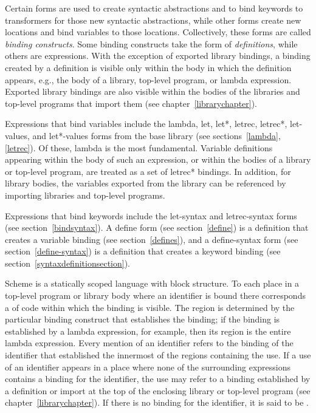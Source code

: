Certain forms are used to create syntactic abstractions
and to bind keywords to transformers for those new syntactic abstractions, while other
forms create new locations and bind variables to those
locations.  Collectively, these forms are called {\em binding
  constructs}.
Some binding constructs take the form of
\textit{definitions}, while others are
expressions.
With the exception of exported library bindings, a binding created
by a definition is visible only within the body in which the
definition appears, e.g., the body of a library, top-level program,
or {\cf lambda} expression.
Exported library bindings are also visible within the bodies of
the libraries and top-level programs that import them (see
chapter~\ref{librarychapter}).

Expressions that bind variables include the {\cf lambda},
{\cf let}, {\cf let*}, {\cf letrec}, {\cf letrec*}, {\cf let-values},
and {\cf let*-values} forms from the base library (see
sections~\ref{lambda}, \ref{letrec}).
Of these, {\cf lambda} is the most fundamental.
Variable definitions appearing within the body of 
such an expression, or within the bodies of a library or top-level
program, are treated as a set of
{\cf letrec*} bindings.
In addition, for library bodies, 
the variables exported from the library can be referenced by
importing libraries and top-level programs.

Expressions that bind keywords include the {\cf
  let-syntax} and {\cf letrec-syntax} forms (see
section~\ref{bindsyntax}).  A {\cf define} form (see section~\ref{define}) is a
definition that creates a variable binding (see 
section~\ref{defines}), and a {\cf define-syntax} form (see
section~\ref{define-syntax}) is
a definition that creates a keyword binding (see
section~\ref{syntaxdefinitionsection}).

\vest Scheme is a statically scoped language with
block structure.  To each place in a top-level program or library body where an identifier is bound 
there corresponds a  of code within which
the binding is visible.  The region is determined by the particular
binding construct that establishes the binding; if the binding is
established by a {\cf lambda} expression, for example, then its region
is the entire {\cf lambda} expression.  Every mention of an identifier
refers to the binding of the identifier that established the
innermost of the regions containing the use.  If a use of an
identifier appears in a place where none of the surrounding expressions
contains a binding for the identifier, the use may refer to a
binding established by a definition or import at the top of the
enclosing library or top-level program
(see chapter~\ref{librarychapter}).
If there is no binding for the identifier,
it is said to be .

